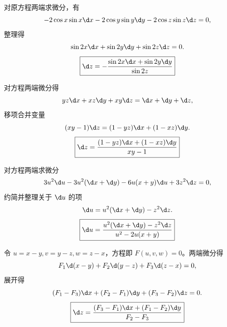 \begin{solution}

    对原方程两端求微分，有
    \begin{equation}
        -2\cos x \sin x \d x - 2\cos y \sin y \d y - 2\cos z \sin z \d z = 0,
    \end{equation}
    整理得
    \begin{equation}
        \sin 2x \d x + \sin 2y \d y + \sin 2z \d z = 0.
    \end{equation}
    \begin{equation}
        \boxed{\d z = - \frac{\sin 2x \d x + \sin 2y \d y}{\sin 2z}}
    \end{equation}


    对方程两端微分得
    \begin{equation}
        yz \d x + xz \d y + xy \d z = \d x + \d y + \d z,
    \end{equation}
    移项合并变量
    \begin{equation}
        (xy - 1) \d z = (1 - yz) \d x + (1 - xz) \d y.
    \end{equation}
    \begin{equation}
        \boxed{\d z = \frac{(1 - yz) \d x + (1 - xz) \d y}{xy - 1}}
    \end{equation}


    对方程两端求微分
    \begin{equation}
        3u^2 \d u - 3u^2 (\d x + \d y) - 6u(x + y) \d u + 3z^2 \d z = 0,
    \end{equation}
    约简并整理关于 $\d u$ 的项
    \begin{equation}
        [u^2 - 2u(x + y)] \d u = u^2(\d x + \d y) - z^2 \d z.
    \end{equation}
    \begin{equation}
        \boxed{\d u = \frac{u^2(\d x + \d y) - z^2 \d z}{u^2 - 2u(x + y)}}
    \end{equation}


    令 $u = x - y, v = y - z, w = z - x$，方程即 $F(u, v, w) = 0$。两端微分得
    \begin{equation}
        F_1 \d (x - y) + F_2 \d (y - z) + F_3 \d (z - x) = 0,
    \end{equation}
    展开得
    \begin{equation}
        (F_1 - F_3) \d x + (F_2 - F_1) \d y + (F_3 - F_2) \d z = 0.
    \end{equation}
    \begin{equation}
        \boxed{\d z = \frac{(F_3 - F_1) \d x + (F_1 - F_2) \d y}{F_2 - F_3}}
    \end{equation}
\end{solution}


